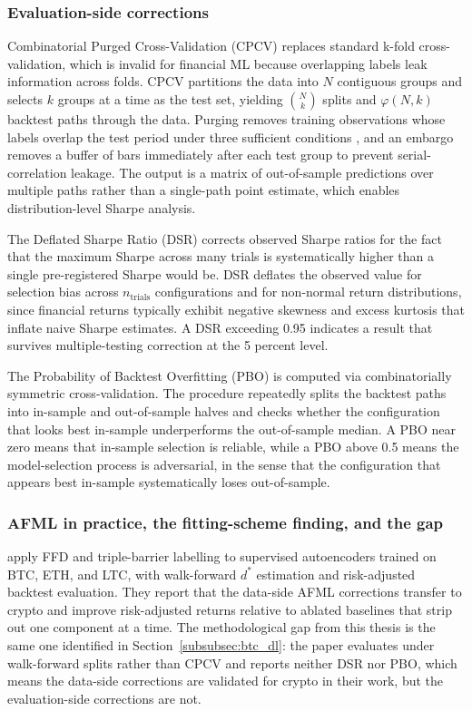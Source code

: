 \documentclass[12pt,a4paper,oneside]{article}
\begin{document}
\subsubsection{Evaluation-side corrections}\label{subsubsec:afml_eval_side}

Combinatorial Purged Cross-Validation (CPCV) replaces standard k-fold cross-validation, which is invalid for financial ML because overlapping labels leak information across folds. CPCV partitions the data into $N$ contiguous groups and selects $k$ groups at a time as the test set, yielding $\binom{N}{k}$ splits and $\varphi(N, k)$ backtest paths through the data. Purging removes training observations whose labels overlap the test period under three sufficient conditions \citep[Ch.~7]{lopez_de_prado_2018}, and an embargo removes a buffer of bars immediately after each test group to prevent serial-correlation leakage. The output is a matrix of out-of-sample predictions over multiple paths rather than a single-path point estimate, which enables distribution-level Sharpe analysis.

The Deflated Sharpe Ratio (DSR) corrects observed Sharpe ratios for the fact that the maximum Sharpe across many trials is systematically higher than a single pre-registered Sharpe would be. DSR deflates the observed value for selection bias across $n_{\text{trials}}$ configurations and for non-normal return distributions, since financial returns typically exhibit negative skewness and excess kurtosis that inflate naive Sharpe estimates. A DSR exceeding 0.95 indicates a result that survives multiple-testing correction at the 5 percent level.

The Probability of Backtest Overfitting (PBO) is computed via combinatorially symmetric cross-validation. The procedure repeatedly splits the backtest paths into in-sample and out-of-sample halves and checks whether the configuration that looks best in-sample underperforms the out-of-sample median. A PBO near zero means that in-sample selection is reliable, while a PBO above 0.5 means the model-selection process is adversarial, in the sense that the configuration that appears best in-sample systematically loses out-of-sample.


\subsubsection{AFML in practice, the fitting-scheme finding, and the gap}\label{subsubsec:afml_practice_gap}

\citet{slepaczuk_bieganowski_2024} apply FFD and triple-barrier labelling to supervised autoencoders trained on BTC, ETH, and LTC, with walk-forward $d^*$ estimation and risk-adjusted backtest evaluation. They report that the data-side AFML corrections transfer to crypto and improve risk-adjusted returns relative to ablated baselines that strip out one component at a time. The methodological gap from this thesis is the same one identified in Section~\ref{subsubsec:btc_dl}: the paper evaluates under walk-forward splits rather than CPCV and reports neither DSR nor PBO, which means the data-side corrections are validated for crypto in their work, but the evaluation-side corrections are not.
\end{document}
